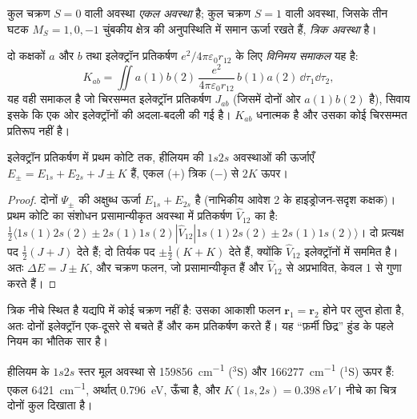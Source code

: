\begin{definition}\label{def:b3:many-electron-atoms:singlet-triplet}
कुल चक्रण $S = 0$ वाली अवस्था \emph{एकल अवस्था} है;
कुल चक्रण $S = 1$ वाली अवस्था, जिसके तीन घटक $M_S = 1, 0, -1$ चुंबकीय क्षेत्र की
अनुपस्थिति में समान ऊर्जा रखते हैं, \emph{त्रिक
अवस्था} है।
\end{definition}

\begin{definition}[विनिमय समाकल]\label{def:b3:many-electron-atoms:exchange}
दो कक्षकों $a$ और $b$ तथा इलेक्ट्रॉन प्रतिकर्षण $e^2/4\pi\varepsilon_0
r_{12}$ के लिए \emph{विनिमय समाकल} यह है:
\[
K_{ab} = \iint a(1)b(2)\,\frac{e^2}{4\pi\varepsilon_0r_{12}}\,b(1)a(2)\,\dd\tau_1\dd\tau_2,
\]
यह वही समाकल है जो चिरसम्मत इलेक्ट्रॉन प्रतिकर्षण $J_{ab}$ (जिसमें
दोनों ओर $a(1)b(2)$ है), सिवाय इसके कि एक ओर इलेक्ट्रॉनों की अदला-बदली की गई है।
$K_{ab}$ धनात्मक है और उसका कोई चिरसम्मत प्रतिरूप नहीं है।
\end{definition}

\begin{proposition}[एकल और त्रिक ऊर्जाएँ]\label{prop:b3:many-electron-atoms:helium}
इलेक्ट्रॉन प्रतिकर्षण में प्रथम कोटि तक, हीलियम की $1s2s$ अवस्थाओं की
ऊर्जाएँ $E_\pm = E_{1s} + E_{2s} + J \pm K$ हैं, एकल ($+$)
त्रिक ($-$) से $2K$ ऊपर।
\end{proposition}

\begin{proof}
दोनों $\Psi_\pm$ की अक्षुब्ध ऊर्जा $E_{1s} + E_{2s}$ है (नाभिकीय आवेश 2 के
हाइड्रोजन-सदृश कक्षक)। प्रथम कोटि का संशोधन प्रसामान्यीकृत अवस्था में प्रतिकर्षण
$\hat V_{12}$ का  है:
$\frac12\langle 1s(1)2s(2) \pm 2s(1)1s(2)|\hat V_{12}|1s(1)2s(2) \pm
2s(1)1s(2)\rangle$। दो प्रत्यक्ष पद $\frac12(J + J)$ देते हैं; दो तिर्यक
पद $\pm\frac12(K + K)$ देते हैं, क्योंकि $\hat V_{12}$ इलेक्ट्रॉनों में
सममित है। अतः $\Delta E = J \pm K$, और चक्रण फलन, जो प्रसामान्यीकृत हैं और
$\hat V_{12}$ से अप्रभावित, केवल 1 से गुणा करते हैं।
\end{proof}

त्रिक नीचे स्थित है यद्यपि  में कोई चक्रण नहीं है: उसका
आकाशी फलन $\mathbf r_1 = \mathbf r_2$ होने पर लुप्त होता है, अतः दोनों
इलेक्ट्रॉन एक-दूसरे से बचते हैं और कम प्रतिकर्षण करते हैं। यह ``फ़र्मी छिद्र''
हुंड के पहले नियम का भौतिक सार है।

\begin{example}[हीलियम का विनिमय समाकल, मापित]\label{ex:b3:many-electron-atoms:K}
हीलियम के $1s2s$ स्तर मूल अवस्था से \qty{159856}{cm^{-1}} (${}^3$S) और
\qty{166277}{cm^{-1}} (${}^1$S) ऊपर हैं: एकल
\qty{6421}{cm^{-1}}, अर्थात् \qty{0.796}{eV}, ऊँचा है, और $K(1s,2s) = \qty{0.398}{eV}$।
नीचे का चित्र दोनों कुल दिखाता है।
\end{example}

